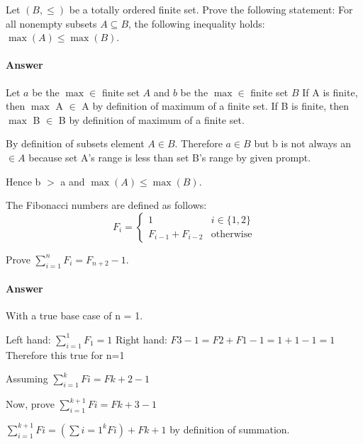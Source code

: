\documentclass{article}
\begin{document}
 

Let $(B,\leq)$ be a totally ordered finite set. Prove the following
statement: For all nonempty subsets $A \subseteq B$, the following inequality
holds: $\max(A) \leq \max(B)$.

\paragraph{Answer}

Let $a$ be the $\max \in$ finite set $A$ and $b$ be the $\max \in$ finite set $B$
If A is finite, then $\max$ A $\in$ A by definition of maximum of a finite set.
If B is finite, then $\max$ B $\in$ B by definition of maximum of a finite set.

By definition of subsets element $A \in B$. Therefore $a \in B$ but b is not always
an $\in A$ because set A's range is less than set B's range by given prompt.

Hence b $>$ a and $\max(A) \leq \max(B)$.

 

The Fibonacci numbers are defined as follows:
$$
    F_i = \begin{cases}
            1 & i \in \{1,2\} \\
            F_{i-1}+F_{i-2} & \text{otherwise}
          \end{cases}
$$

Prove $\sum_{i=1}^n F_i = F_{n+2}-1$.

\paragraph{Answer}

With a true base case of n = 1.

Left hand: $\sum_{i=1}^1 F_1 = 1$
Right hand: $F{3}-1 = F{2}+F{1}-1 = 1+1-1 = 1$
Therefore this true for n=1

Assuming $\sum_{i=1}^k Fi = F{k+2}-1$

Now, prove $\sum_{i=1}^{k+1} Fi = F{k+3}-1$

$\sum_{i=1}^{k+1} Fi = (\sum{i=1}^k Fi) + F{k+1}$ by definition of summation.
\end{document}
